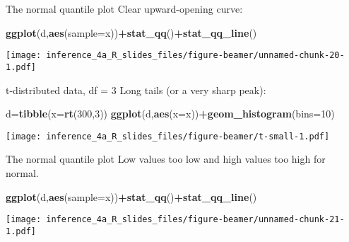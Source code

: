 \documentclass[
  ignorenonframetext,
]{beamer}
\newenvironment{Shaded}{\begin{snugshade}}{\end{snugshade}}
\newcommand{\DataTypeTok}[1]{\textcolor[rgb]{0.13,0.29,0.53}{#1}}
\newcommand{\DecValTok}[1]{\textcolor[rgb]{0.00,0.00,0.81}{#1}}
\newcommand{\KeywordTok}[1]{\textcolor[rgb]{0.13,0.29,0.53}{\textbf{#1}}}
\newcommand{\NormalTok}[1]{#1}
\newcommand{\OperatorTok}[1]{\textcolor[rgb]{0.81,0.36,0.00}{\textbf{#1}}}
\begin{document}
\begin{frame}[fragile]{The normal quantile plot}
\protect\hypertarget{the-normal-quantile-plot-3}{}
Clear upward-opening curve:

\begin{Shaded}
\begin{Highlighting}[]
\KeywordTok{ggplot}\NormalTok{(d,}\KeywordTok{aes}\NormalTok{(}\DataTypeTok{sample=}\NormalTok{x))}\OperatorTok{+}\KeywordTok{stat\_qq}\NormalTok{()}\OperatorTok{+}\KeywordTok{stat\_qq\_line}\NormalTok{()}
\end{Highlighting}
\end{Shaded}

\texttt{[image: inference\_4a\_R\_slides\_files/figure-beamer/unnamed-chunk-20-1.pdf]}
\end{frame}

\begin{frame}[fragile]{t-distributed data, df = 3}
\protect\hypertarget{t-distributed-data-df-3}{}
Long tails (or a very sharp peak):

\begin{Shaded}
\begin{Highlighting}[]
\NormalTok{d=}\KeywordTok{tibble}\NormalTok{(}\DataTypeTok{x=}\KeywordTok{rt}\NormalTok{(}\DecValTok{300}\NormalTok{,}\DecValTok{3}\NormalTok{))}
\KeywordTok{ggplot}\NormalTok{(d,}\KeywordTok{aes}\NormalTok{(}\DataTypeTok{x=}\NormalTok{x))}\OperatorTok{+}\KeywordTok{geom\_histogram}\NormalTok{(}\DataTypeTok{bins=}\DecValTok{10}\NormalTok{)}
\end{Highlighting}
\end{Shaded}

\texttt{[image: inference\_4a\_R\_slides\_files/figure-beamer/t-small-1.pdf]}
\end{frame}

\begin{frame}[fragile]{The normal quantile plot}
\protect\hypertarget{the-normal-quantile-plot-4}{}
Low values too low and high values too high for normal.

\begin{Shaded}
\begin{Highlighting}[]
\KeywordTok{ggplot}\NormalTok{(d,}\KeywordTok{aes}\NormalTok{(}\DataTypeTok{sample=}\NormalTok{x))}\OperatorTok{+}\KeywordTok{stat\_qq}\NormalTok{()}\OperatorTok{+}\KeywordTok{stat\_qq\_line}\NormalTok{()}
\end{Highlighting}
\end{Shaded}

\texttt{[image: inference\_4a\_R\_slides\_files/figure-beamer/unnamed-chunk-21-1.pdf]}
\end{frame}
\end{document}
